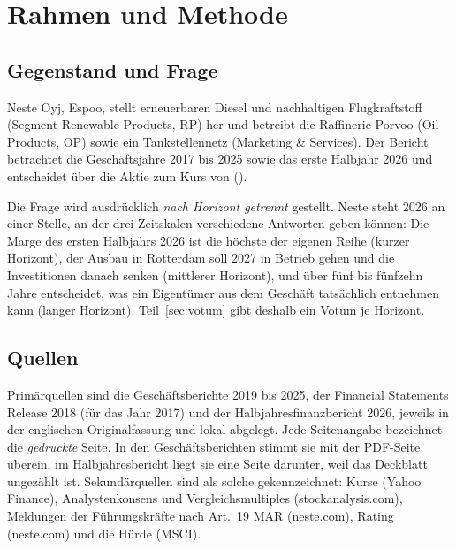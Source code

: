 \section*{Rahmen und Methode}
\label{sec:methode}

\subsection*{Gegenstand und Frage}

Neste Oyj, Espoo, stellt erneuerbaren Diesel und nachhaltigen Flugkraftstoff (Segment
Renewable Products, RP) her und betreibt die Raffinerie Porvoo (Oil Products, OP) sowie ein
Tankstellennetz (Marketing \& Services). Der Bericht betrachtet die Gesch\"aftsjahre 2017
bis 2025 sowie das erste Halbjahr 2026 und entscheidet \"uber die Aktie zum Kurs von
 (\KursDatum).

Die Frage wird ausdr\"ucklich \emph{nach Horizont getrennt} gestellt. Neste steht 2026 an
einer Stelle, an der drei Zeitskalen verschiedene Antworten geben k\"onnen: Die Marge des
ersten Halbjahrs 2026 ist die h\"ochste der eigenen Reihe (kurzer Horizont), der Ausbau in
Rotterdam soll 2027 in Betrieb gehen und die Investitionen danach senken (mittlerer
Horizont), und \"uber f\"unf bis f\"unfzehn Jahre entscheidet, was ein Eigent\"umer aus dem
Gesch\"aft tats\"achlich entnehmen kann (langer Horizont). Teil~\ref{sec:votum} gibt deshalb
ein Votum je Horizont.

\subsection*{Quellen}

Prim\"arquellen sind die Gesch\"aftsberichte 2019 bis 2025, der Financial Statements
Release 2018 (f\"ur das Jahr 2017) und der Halbjahresfinanzbericht 2026, jeweils in der
englischen Originalfassung und lokal abgelegt. Jede Seitenangabe bezeichnet die
\emph{gedruckte} Seite. In den Gesch\"aftsberichten stimmt sie mit der PDF-Seite
\"uberein, im Halbjahresbericht liegt sie eine Seite darunter, weil das Deckblatt
ungez\"ahlt ist. Sekund\"arquellen sind als solche gekennzeichnet: Kurse (Yahoo Finance),
Analystenkonsens und Vergleichsmultiples (stockanalysis.com), Meldungen der
F\"uhrungskr\"afte nach Art.~19 MAR (neste.com), Rating (neste.com) und die H\"urde (MSCI).

